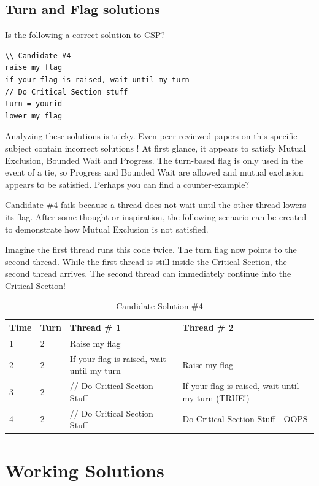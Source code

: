 \subsection{Turn and Flag solutions}

Is the following a correct solution to CSP?

\begin{lstlisting}
\\ Candidate #4
raise my flag
if your flag is raised, wait until my turn
// Do Critical Section stuff
turn = yourid
lower my flag
\end{lstlisting}

Analyzing these solutions is tricky.
Even peer-reviewed papers on this specific subject contain incorrect solutions \cite{Hyman:1966:CPC:365153.365167}!
At first glance, it appears to satisfy Mutual Exclusion, Bounded Wait and Progress.
The turn-based flag is only used in the event of a tie, so Progress and Bounded Wait are allowed and mutual exclusion appears to be satisfied.
Perhaps you can find a counter-example?

Candidate \#4 fails because a thread does not wait until the other thread lowers its flag.
After some thought or inspiration, the following scenario can be created to demonstrate how Mutual Exclusion is not satisfied.

Imagine the first thread runs this code twice.
The turn flag now points to the second thread.
While the first thread is still inside the Critical Section, the second thread arrives.
The second thread can immediately continue into the Critical Section!

\begin{center}
\begin{table}[h]
\caption{Candidate Solution \#4}
\begin{tabular}{|l|l|l|l|}
Time & Turn & Thread \# 1 & Thread \# 2 \\ \hline
1 & 2 & Raise my flag & \\
2 & 2 & If your flag is raised, wait until my turn & Raise my flag \\
3 & 2 & // Do Critical Section Stuff & If your flag is raised, wait until my turn (TRUE!) \\
4 & 2 & // Do Critical Section Stuff & Do Critical Section Stuff - OOPS \\
\end{tabular}
\end{table}
\end{center}

\section{Working Solutions}

